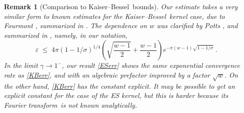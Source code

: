 \documentclass[10pt]{article}
\newcommand{\be}{\begin{equation}}
\newcommand{\ee}{\end{equation}}
\newcommand{\eps}{\varepsilon}
\newtheorem{rmk}[thm]{Remark}
\newcommand{\rat}{\sigma}          %
\newcommand{\KB}{Kaiser--Bessel}
\newcommand{\FT}{Fourier transform}
\begin{document}
\begin{rmk}[Comparison to \KB\ bounds]
  \label{fourmont}
  Our estimate takes a very similar form to known estimates
  for the \KB\ kernel case, due to Fourmont \cite[p.~30-38]{fourmontthesis},
  summarized in \cite[Sec.~4]{fourmont}.
  The dependence on $w$ was clarified by Potts \cite[p.~30-31]{pottshabil},
  and summarized in \cite[App.~C]{nfft}, namely, in our notation,
  \be
  \eps \;\le\; 4\pi   (1-1/\rat)^{1/4}
  \left(\sqrt{\frac{w-1}{2}}+\frac{w-1}{2}\right)
  e^{-\pi(w-1)\sqrt{1-1/\rat}}
  ~.
  \label{KBerr}
  \ee
  In the limit $\gamma\to1^{-}$, our result \eqref{ESerr}
  shows the same exponential convergence rate as \eqref{KBerr},
  and with an algebraic prefactor improved by a factor $\sqrt{w}$.
  On the other hand, \eqref{KBerr} has the constant explicit.
  It may be possible to get an explicit constant for the case of the ES kernel,
  but this is harder
  because its \FT\ is not known analytically.
\end{rmk}
\end{document}
